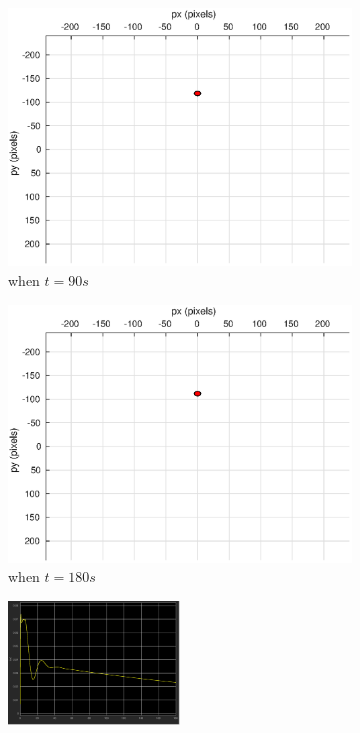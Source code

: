 \begin{figure}
\begin{subfigure}[b]{0.32\linewidth}
		\includegraphics[width=\textwidth]{images/chapter4/image_camera_5mps_90s}
		\caption{when $t=90s$}
	\end{subfigure}
	\begin{subfigure}[b]{0.32\linewidth}
		\includegraphics[width=\textwidth]{images/chapter4/image_camera_5mps_180s}
		\caption{when $t=180s$}
	\end{subfigure}	
	\begin{subfigure}[b]{0.8\linewidth}
		\centering
		\includegraphics[width=0.5\textwidth]{images/chapter4/image_Ex_5mps}

\end{subfigure}
\end{figure}
